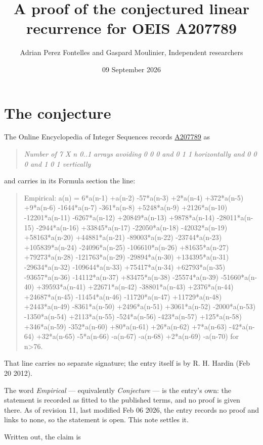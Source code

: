 \documentclass[11pt]{article}
\title{A proof of the conjectured linear recurrence for OEIS A207789}
\author{Adrian Perez Fontelles and Gaspard Moulinier, Independent researchers}
\date{09 September 2026}
\theoremstyle{definition}
\begin{document}
\maketitle
\section{The conjecture}

The Online Encyclopedia of Integer Sequences records \href{https://oeis.org/A207789}{A207789} as

\begin{quote}\itshape Number of 7 X n 0..1 arrays avoiding 0 0 0 and 0 1 1 horizontally and 0 0 0 and 1 0 1 vertically\end{quote}

and carries in its Formula section the line:

\begin{quote}\ttfamily Empirical: a(n) = 6*a(n-1) +a(n-2) -57*a(n-3) +2*a(n-4) +372*a(n-5) +9*a(n-6) -1644*a(n-7) -361*a(n-8) +5248*a(n-9) +2126*a(n-10) -12201*a(n-11) -6267*a(n-12) +20849*a(n-13) +9878*a(n-14) -28011*a(n-15) -2944*a(n-16) +33845*a(n-17) -22050*a(n-18) -42032*a(n-19) +58163*a(n-20) +44881*a(n-21) -89003*a(n-22) -23744*a(n-23) +105839*a(n-24) -24096*a(n-25) -106610*a(n-26) +81635*a(n-27) +79273*a(n-28) -121763*a(n-29) -29894*a(n-30) +134395*a(n-31) -29634*a(n-32) -109644*a(n-33) +75417*a(n-34) +62793*a(n-35) -93657*a(n-36) -14112*a(n-37) +83475*a(n-38) -25574*a(n-39) -51660*a(n-40) +39593*a(n-41) +22671*a(n-42) -38801*a(n-43) +2376*a(n-44) +24687*a(n-45) -11454*a(n-46) -11720*a(n-47) +11729*a(n-48) +2443*a(n-49) -8361*a(n-50) +2496*a(n-51) +3061*a(n-52) -2000*a(n-53) -1350*a(n-54) +2113*a(n-55) -524*a(n-56) -423*a(n-57) +125*a(n-58) +346*a(n-59) -352*a(n-60) +80*a(n-61) +26*a(n-62) +7*a(n-63) -42*a(n-64) +32*a(n-65) -5*a(n-66) -a(n-67) -a(n-68) +2*a(n-69) -a(n-70) for n>76.\end{quote}

That line carries no separate signature; the entry itself is by R. H. Hardin (Feb 20 2012).

The word {\itshape Empirical} --- equivalently {\itshape Conjecture} --- is the entry's own: the statement is recorded as fitted to the published terms, and no proof is given there. As of revision 11, last modified Feb 06 2026, the entry records no proof and links to none, so the statement is open. This note settles it.

Written out, the claim is
\end{document}
